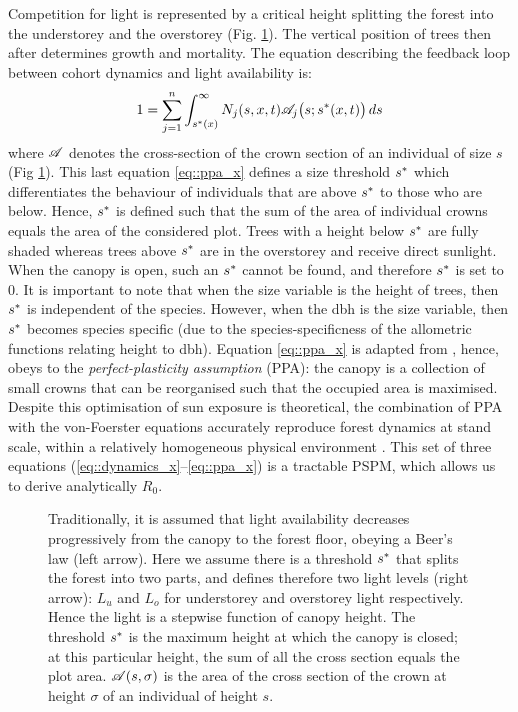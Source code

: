 Competition for light is represented by a critical height splitting the forest into the understorey and the overstorey (Fig. \ref{fig::ppa}). The vertical position of trees then after determines growth and mortality. The equation describing the feedback loop between cohort dynamics and light availability is:
\begin{equation}
	1 = \sum_{j = 1}^{n} \int_{{s}^{*}(x)}^{\infty} N_j(s, x, t) \mathscr{A}_j \big(s; {s}^{*}(x, t)\big) \, ds \label{eq::ppa_x}
\end{equation}
where $ \mathscr{A} $ denotes the cross-section of the crown section of an individual of size $ s $ (Fig \ref{fig::ppa}). This last equation \eqref{eq::ppa_x} defines a size threshold $ {s}^{*} $ which differentiates the behaviour of individuals that are above $ {s}^{*} $ to those who are below. Hence, $ {s}^{*} $ is defined such that the sum of the area of individual crowns equals the area of the considered plot. Trees with a height below $ {s}^{*} $ are fully shaded whereas trees above $ {s}^{*} $ are in the overstorey and receive direct sunlight. When the canopy is open, such an $ {s}^{*} $ cannot be found, and therefore $ {s}^{*} $ is set to $ 0 $. It is important to note that when the size variable is the height of trees, then $ {s}^{*} $ is independent of the species. However, when the dbh is the size variable, then $ {s}^{*} $ becomes species specific (due to the species-specificness of the allometric functions relating height to dbh). Equation \eqref{eq::ppa_x} is adapted from \citet{Strigul2008}, hence, obeys to the \textit{perfect-plasticity assumption} (PPA): the canopy is a collection of small crowns that can be reorganised such that the occupied area is maximised. Despite this optimisation of sun exposure is theoretical, the combination of PPA with the von-Foerster equations accurately reproduce forest dynamics at stand scale, within a relatively homogeneous physical environment \citep{Strigul2008, Purves2008}. This set of three equations (\ref{eq::dynamics_x}--\ref{eq::ppa_x}) is a tractable PSPM, which allows us to derive analytically $ R_0 $.

\begin{figure}
	\centering
	
	\caption{Traditionally, it is assumed that light availability decreases progressively from the canopy to the forest floor, obeying a Beer's law (left arrow). Here we assume there is a threshold $ {s}^{*} $ that splits the forest into two parts, and defines therefore two light levels (right arrow): $ L_u $ and $ L_o $ for understorey and overstorey light respectively. Hence the light is a stepwise function of canopy height. The threshold $ {s}^{*} $ is the maximum height at which the canopy is closed; at this particular height, the sum of all the cross section equals the plot area. $ \mathscr{A}(s, \sigma) $ is the area of the cross section of the crown at height $ \sigma $ of an individual of height $ s $. \label{fig::ppa}}
\end{figure}

